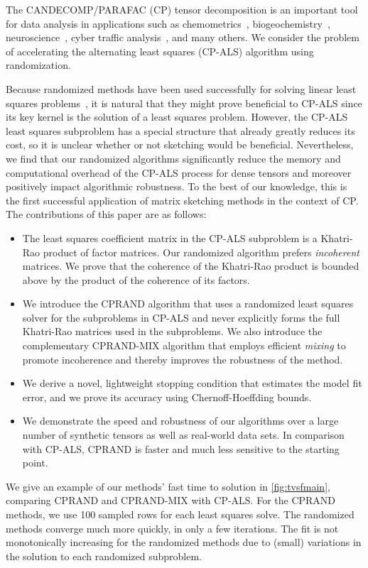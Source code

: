 The CANDECOMP/PARAFAC (CP) tensor decomposition is an important tool
for data analysis in applications such as chemometrics~\cite{MuStGrBr13}, biogeochemistry~\cite{JaCaYa14},
neuroscience~\cite{AcBiBiBr07,DaGiCaWa13,CoLiKuGo15}, cyber traffic analysis~\cite{MaGuFa11}, and many others.
%
We consider the problem of accelerating the alternating least squares (CP-ALS) algorithm using randomization.

Because randomized methods have been used successfully for solving
linear least squares problems~\cite{DrMaMuSa11,blendenpik,sketching}, it is natural that they might prove
beneficial to CP-ALS since its key kernel is the solution of a least
squares problem. However, the CP-ALS least squares subproblem has a
special structure that already greatly reduces its cost, so it is unclear whether or not sketching would be beneficial.
Nevertheless, we find that our randomized algorithms significantly reduce the memory and computational overhead of the CP-ALS process for dense tensors and moreover positively impact algorithmic robustness.
To the best of our knowledge, this is the first successful application of matrix sketching methods in the context of CP.
The contributions of this paper are as follows:
\begin{itemize}
\item 
The least squares coefficient matrix in the CP-ALS subproblem is a Khatri-Rao product of factor matrices. 
Our randomized algorithm prefers \emph{incoherent} matrices.
We prove that the coherence of the Khatri-Rao product is bounded 
above by the product of the coherence of its factors.
\item We introduce the CPRAND algorithm that uses a randomized least squares solver for the subproblems in CP-ALS and never explicitly forms the full Khatri-Rao matrices used in the subproblems.
We also introduce the complementary CPRAND-MIX algorithm that employs efficient \emph{mixing} to promote incoherence and thereby improves the robustness of the method.
\item We derive a novel, lightweight stopping condition that estimates
  the model fit error, and we prove its accuracy using Chernoff-Hoeffding bounds.
\item We demonstrate the speed and robustness of our algorithms over a
  large number of synthetic tensors as well as real-world data
  sets. In comparison with CP-ALS, CPRAND is faster and much less sensitive to
  the starting point. 
\end{itemize}
We give an example of our methods' fast time to solution in \cref{fig:tvsfmain},
comparing CPRAND and CPRAND-MIX with CP-ALS.
For the CPRAND methods, we use 100 sampled rows for each least squares solve.
The randomized methods converge much more quickly, in only a few
iterations. 
The fit is not monotonically increasing for the randomized methods due
to (small) variations in the solution to each randomized subproblem.

